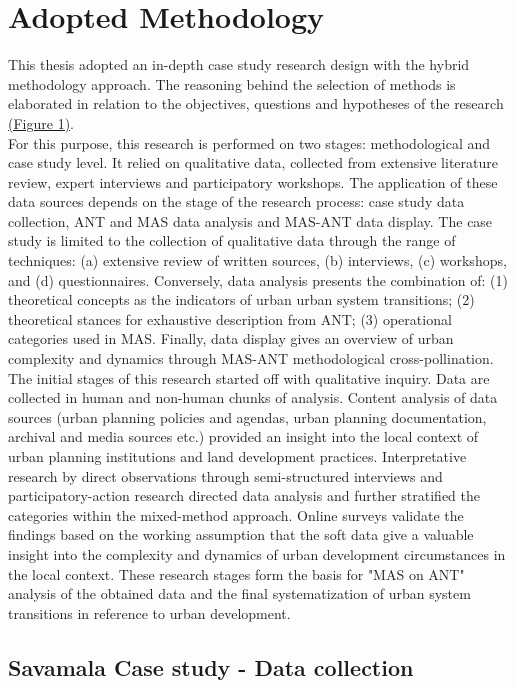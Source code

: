 \documentclass[11pt]{report}
\begin{document}
\section{Adopted Methodology}

This thesis adopted an in-depth case study research design with the hybrid methodology approach. The reasoning behind the selection of methods is elaborated in relation to the objectives, questions and hypotheses of the research \href{ref}{(Figure 1)}.  
\\
For this purpose, this research is performed on two stages: methodological and case study level. It relied on qualitative data, collected from extensive literature review, expert interviews and participatory workshops. The application of these data sources depends on the stage of the research process: case study data collection, ANT and MAS data analysis and MAS-ANT data display. The case study is limited to the collection of qualitative data through the range of techniques: (a) extensive review of written sources, (b) interviews, (c) workshops, and (d) questionnaires. Conversely, data analysis presents the combination of: (1) theoretical concepts as the indicators of urban urban system transitions; (2) theoretical stances for exhaustive description from ANT; (3) operational categories used in MAS. Finally, data display gives an overview of urban complexity and dynamics through MAS-ANT methodological cross-pollination. 
\\
The initial stages of this research started off with qualitative inquiry. Data are collected in human and non-human chunks of analysis. Content analysis of data sources (urban planning policies and agendas, urban planning documentation, archival and media sources etc.) provided an insight into the local context of urban planning institutions and land development practices. Interpretative research by  direct observations through semi-structured interviews and participatory-action research directed data analysis and further stratified the categories within the mixed-method approach.
Online surveys validate the findings based on the working assumption that the soft data give a valuable insight into the complexity and dynamics of urban development circumstances in the local context. These research stages form the basis for "MAS on ANT" analysis of the obtained data and the final systematization of urban system transitions in reference to urban development.

\subsection{Savamala Case study - Data collection} \label{sec:predis}
\end{document}
